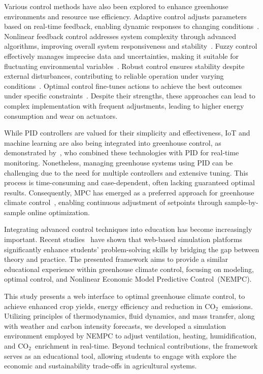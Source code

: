 \documentclass[conference]{IEEEtran}
\newcommand{\coo}{\ensuremath{\mathrm{CO_2}}}
\begin{document}
Various control methods have also been explored to enhance greenhouse environments and resource use efficiency. Adaptive control adjusts parameters based on real-time feedback, enabling dynamic responses to changing conditions~\cite{Tian2022}. Nonlinear feedback control addresses system complexity through advanced algorithms, improving overall system responsiveness and stability~\cite{Bood2023}. Fuzzy control effectively manages imprecise data and uncertainties, making it suitable for fluctuating environmental variables~\cite{smartcities7030055}. Robust control ensures stability despite external disturbances, contributing to reliable operation under varying conditions~\cite{Zhang2021}. Optimal control fine-tunes actions to achieve the best outcomes under specific constraints~\cite{Debroy2024, SVENSEN2024108578}. Despite their strengths, these approaches can lead to complex implementation with frequent adjustments, leading to higher energy consumption and wear on actuators.

While PID controllers are valued for their simplicity and effectiveness, IoT and machine learning are also being integrated into greenhouse control, as demonstrated by~\cite{Wang2024}, who combined these technologies with PID for real-time monitoring. Nonetheless, managing greenhouse systems using PID can be challenging due to the need for multiple controllers and extensive tuning. This process is time-consuming and case-dependent, often lacking guaranteed optimal results. Consequently, MPC has emerged as a preferred approach for greenhouse climate control~\cite{Hu2022}, enabling continuous adjustment of setpoints through sample-by-sample online optimization.

Integrating advanced control techniques into education has become increasingly important. Recent studies~\cite{WangEducation2024, Zakova2024} have shown that web-based simulation platforms significantly enhance students' problem-solving skills by bridging the gap between theory and practice. The presented framework aims to provide a similar educational experience within greenhouse climate control, focusing on modeling, optimal control, and Nonlinear Economic Model Predictive Control~(NEMPC).

This study presents a web interface to optimal greenhouse climate control, to achieve enhanced crop yields, energy efficiency and reduction in \coo\ emissions. Utilizing principles of thermodynamics, fluid dynamics, and mass transfer, along with weather and carbon intensity forecasts, we developed a simulation environment employed by NEMPC to adjust ventilation, heating, humidification, and \coo\ enrichment in real-time. Beyond technical contributions, the framework serves as an educational tool, allowing students to engage with explore the economic and sustainability trade-offs in agricultural systems.
\end{document}
